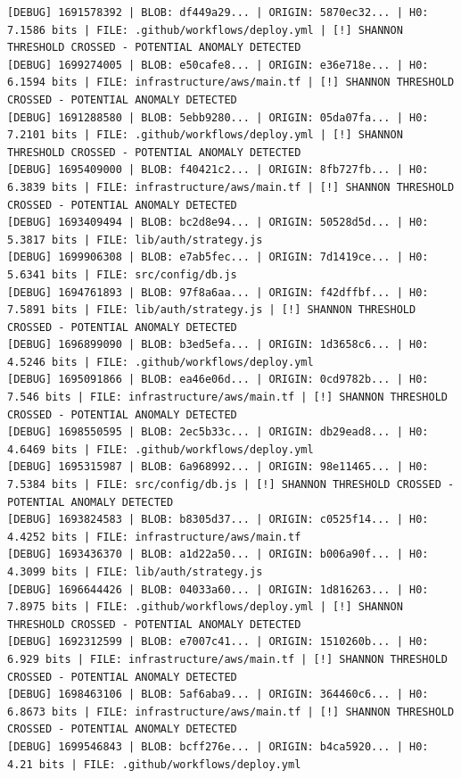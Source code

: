 \documentclass[12pt, a4paper, oneside]{report}
\begin{document}
\begin{lstlisting}[basicstyle=\tiny\ttfamily]
[DEBUG] 1691578392 | BLOB: df449a29... | ORIGIN: 5870ec32... | H0: 7.1586 bits | FILE: .github/workflows/deploy.yml | [!] SHANNON THRESHOLD CROSSED - POTENTIAL ANOMALY DETECTED
[DEBUG] 1699274005 | BLOB: e50cafe8... | ORIGIN: e36e718e... | H0: 6.1594 bits | FILE: infrastructure/aws/main.tf | [!] SHANNON THRESHOLD CROSSED - POTENTIAL ANOMALY DETECTED
[DEBUG] 1691288580 | BLOB: 5ebb9280... | ORIGIN: 05da07fa... | H0: 7.2101 bits | FILE: .github/workflows/deploy.yml | [!] SHANNON THRESHOLD CROSSED - POTENTIAL ANOMALY DETECTED
[DEBUG] 1695409000 | BLOB: f40421c2... | ORIGIN: 8fb727fb... | H0: 6.3839 bits | FILE: infrastructure/aws/main.tf | [!] SHANNON THRESHOLD CROSSED - POTENTIAL ANOMALY DETECTED
[DEBUG] 1693409494 | BLOB: bc2d8e94... | ORIGIN: 50528d5d... | H0: 5.3817 bits | FILE: lib/auth/strategy.js
[DEBUG] 1699906308 | BLOB: e7ab5fec... | ORIGIN: 7d1419ce... | H0: 5.6341 bits | FILE: src/config/db.js
[DEBUG] 1694761893 | BLOB: 97f8a6aa... | ORIGIN: f42dffbf... | H0: 7.5891 bits | FILE: lib/auth/strategy.js | [!] SHANNON THRESHOLD CROSSED - POTENTIAL ANOMALY DETECTED
[DEBUG] 1696899090 | BLOB: b3ed5efa... | ORIGIN: 1d3658c6... | H0: 4.5246 bits | FILE: .github/workflows/deploy.yml
[DEBUG] 1695091866 | BLOB: ea46e06d... | ORIGIN: 0cd9782b... | H0: 7.546 bits | FILE: infrastructure/aws/main.tf | [!] SHANNON THRESHOLD CROSSED - POTENTIAL ANOMALY DETECTED
[DEBUG] 1698550595 | BLOB: 2ec5b33c... | ORIGIN: db29ead8... | H0: 4.6469 bits | FILE: .github/workflows/deploy.yml
[DEBUG] 1695315987 | BLOB: 6a968992... | ORIGIN: 98e11465... | H0: 7.5384 bits | FILE: src/config/db.js | [!] SHANNON THRESHOLD CROSSED - POTENTIAL ANOMALY DETECTED
[DEBUG] 1693824583 | BLOB: b8305d37... | ORIGIN: c0525f14... | H0: 4.4252 bits | FILE: infrastructure/aws/main.tf
[DEBUG] 1693436370 | BLOB: a1d22a50... | ORIGIN: b006a90f... | H0: 4.3099 bits | FILE: lib/auth/strategy.js
[DEBUG] 1696644426 | BLOB: 04033a60... | ORIGIN: 1d816263... | H0: 7.8975 bits | FILE: .github/workflows/deploy.yml | [!] SHANNON THRESHOLD CROSSED - POTENTIAL ANOMALY DETECTED
[DEBUG] 1692312599 | BLOB: e7007c41... | ORIGIN: 1510260b... | H0: 6.929 bits | FILE: infrastructure/aws/main.tf | [!] SHANNON THRESHOLD CROSSED - POTENTIAL ANOMALY DETECTED
[DEBUG] 1698463106 | BLOB: 5af6aba9... | ORIGIN: 364460c6... | H0: 6.8673 bits | FILE: infrastructure/aws/main.tf | [!] SHANNON THRESHOLD CROSSED - POTENTIAL ANOMALY DETECTED
[DEBUG] 1699546843 | BLOB: bcff276e... | ORIGIN: b4ca5920... | H0: 4.21 bits | FILE: .github/workflows/deploy.yml

\end{lstlisting}
\end{document}
